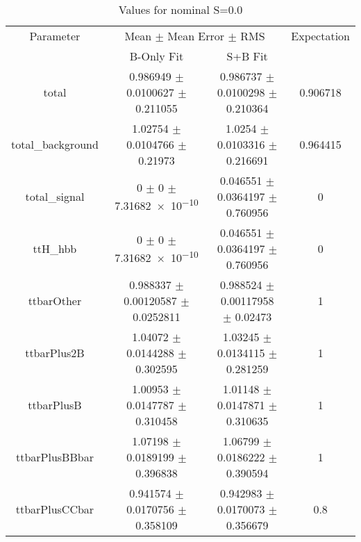 \begin{table}
\centering
\caption{Values for nominal S=0.0}
\begin{tabular}{cccc}
\toprule
Parameter & \multicolumn{2}{c}{Mean $\pm$ Mean Error $\pm$ RMS} & Expectation\\
 & B-Only Fit & S+B Fit & \\
\midrule
total & \num{0.986949} $\pm$ \num{0.0100627} $\pm$ \num{0.211055} & \num{0.986737} $\pm$ \num{0.0100298} $\pm$ \num{0.210364} & \num{0.906718}\\
total\_background & \num{1.02754} $\pm$ \num{0.0104766} $\pm$ \num{0.21973} & \num{1.0254} $\pm$ \num{0.0103316} $\pm$ \num{0.216691} & \num{0.964415}\\
total\_signal & \num{0} $\pm$ \num{0} $\pm$ \num{7.31682e-10} & \num{0.046551} $\pm$ \num{0.0364197} $\pm$ \num{0.760956} & \num{0}\\
ttH\_hbb & \num{0} $\pm$ \num{0} $\pm$ \num{7.31682e-10} & \num{0.046551} $\pm$ \num{0.0364197} $\pm$ \num{0.760956} & \num{0}\\
ttbarOther & \num{0.988337} $\pm$ \num{0.00120587} $\pm$ \num{0.0252811} & \num{0.988524} $\pm$ \num{0.00117958} $\pm$ \num{0.02473} & \num{1}\\
ttbarPlus2B & \num{1.04072} $\pm$ \num{0.0144288} $\pm$ \num{0.302595} & \num{1.03245} $\pm$ \num{0.0134115} $\pm$ \num{0.281259} & \num{1}\\
ttbarPlusB & \num{1.00953} $\pm$ \num{0.0147787} $\pm$ \num{0.310458} & \num{1.01148} $\pm$ \num{0.0147871} $\pm$ \num{0.310635} & \num{1}\\
ttbarPlusBBbar & \num{1.07198} $\pm$ \num{0.0189199} $\pm$ \num{0.396838} & \num{1.06799} $\pm$ \num{0.0186222} $\pm$ \num{0.390594} & \num{1}\\
ttbarPlusCCbar & \num{0.941574} $\pm$ \num{0.0170756} $\pm$ \num{0.358109} & \num{0.942983} $\pm$ \num{0.0170073} $\pm$ \num{0.356679} & \num{0.8}\\
\bottomrule
\end{tabular}
\end{table}